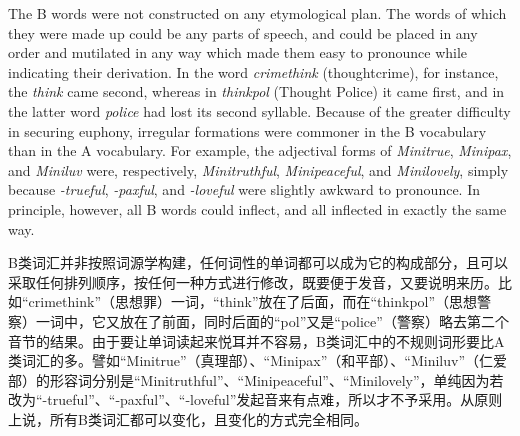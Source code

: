 \begin{paracol}{2}
\switchcolumn*

The B words were not constructed on any etymological plan. The words of
which they were made up could be any parts of speech, and could be
placed in any order and mutilated in any way which made them easy to
pronounce while indicating their derivation. In the word
\emph{crimethink} (thoughtcrime), for instance, the \emph{think} came
second, whereas in \emph{thinkpol} (Thought Police) it came first, and
in the latter word \emph{police} had lost its second syllable. Because
of the greater difficulty in securing euphony, irregular formations were
commoner in the B vocabulary than in the A vocabulary. For example, the
adjectival forms of \emph{Minitrue}, \emph{Minipax}, and \emph{Miniluv}
were, respectively, \emph{Minitruthful}, \emph{Minipeaceful}, and
\emph{Minilovely}, simply because \emph{-trueful}, \emph{-paxful}, and
\emph{-loveful} were slightly awkward to pronounce. In principle,
however, all B words could inflect, and all inflected in exactly the
same way.

\switchcolumn

B类词汇并非按照词源学构建，任何词性的单词都可以成为它的构成部分，且可以采取任何排列顺序，按任何一种方式进行修改，既要便于发音，又要说明来历。比如``crimethink''（思想罪）一词，``think''放在了后面，而在``thinkpol''（思想警察）一词中，它又放在了前面，同时后面的``pol''又是``police''（警察）略去第二个音节的结果。由于要让单词读起来悦耳并不容易，B类词汇中的不规则词形要比A类词汇的多。譬如``Minitrue''（真理部）、``Minipax''（和平部）、``Miniluv''（仁爱部）的形容词分别是``Minitruthful''、``Minipeaceful''、``Minilovely''，单纯因为若改为``-trueful''、``-paxful''、``-loveful''发起音来有点难，所以才不予采用。从原则上说，所有B类词汇都可以变化，且变化的方式完全相同。

\switchcolumn*


\end{paracol}
